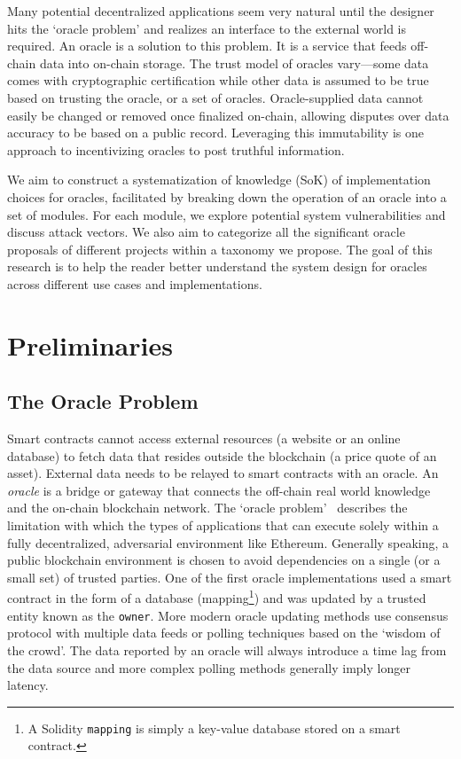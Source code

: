 Many potential decentralized applications seem very natural until the designer hits the `oracle problem' and realizes an interface to the external world is required. An oracle is a solution to this problem. It is a service that feeds off-chain data into on-chain storage. The trust model of oracles vary---some data comes with cryptographic certification while other data is assumed to be true based on trusting the oracle, or a set of oracles. Oracle-supplied data cannot easily be changed or removed once finalized on-chain, allowing disputes over data accuracy to be based on a public record. Leveraging this immutability is one approach to incentivizing oracles to post truthful information.

We aim to construct a systematization of knowledge (SoK) of implementation choices for oracles, facilitated by breaking down the operation of an oracle into a set of modules. For each module, we explore potential system vulnerabilities and discuss attack vectors. We also aim to categorize all the significant oracle proposals of different projects within a taxonomy we propose. The goal of this research is to help the reader better understand the system design for oracles across different use cases and implementations.


\section{Preliminaries}



\subsection{The Oracle Problem}  

Smart contracts cannot access external resources (\eg a website or an online database) to fetch data that resides outside the blockchain (\eg a price quote of an asset). External data needs to be relayed to smart contracts with an oracle. An \emph{oracle} is a bridge or gateway that connects the off-chain real world knowledge and the on-chain blockchain network. The `oracle problem'~\cite{linkOracleProblem} describes the limitation with which the types of applications that can execute solely within a fully decentralized, adversarial environment like Ethereum. Generally speaking, a public blockchain environment is chosen to avoid dependencies on a single (or a small set) of trusted parties. One of the first oracle implementations used a smart contract in the form of a database (\ie mapping\footnote{A Solidity \texttt{mapping} is simply a key-value database stored on a smart contract.}) and was updated by a trusted entity known as the \texttt{owner}. More modern oracle updating methods use consensus protocol with multiple data feeds or polling techniques based on the `wisdom of the crowd'. The data reported by an oracle will always introduce a time lag from the data source and more complex polling methods generally imply longer latency.


